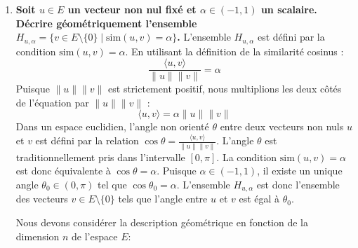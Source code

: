 \documentclass[11pt,a4paper]{report}
\begin{document}
\begin{enumerate}
  \(\lambda \le 0\). De plus, la définition de \(S'_u\) exige que
  \(v \ne 0\). Si \(\lambda = 0\), alors \(v = 0 \cdot u = 0\), ce qui
  contredit la condition \(v \in E \setminus \{0\}\). Par conséquent,
  \(\lambda\) doit être strictement négatif. Ainsi, l'ensemble \(S'_u\)
  est l'ensemble des vecteurs \(v\) qui sont des multiples scalaires
  strictement négatifs de \(u\). Géométriquement, \(S'_u\) représente la
  demi-droite ouverte issue de l'origine et passant par le vecteur
  \(-u\). Tous les vecteurs de \(S'_u\) sont colinéaires à \(u\) et ont
  la direction opposée à \(u\).
\item
  \textbf{Soit \(u \in E\) un vecteur non nul fixé et
  \(\alpha \in (-1, 1)\) un scalaire. Décrire géométriquement l'ensemble
  \(H_{u, \alpha} = \{v \in E \setminus \{0\} \mid \text{sim}(u, v) = \alpha\}\).}
  L'ensemble \(H_{u, \alpha}\) est défini par la condition
  \(\text{sim}(u, v) = \alpha\). En utilisant la définition de la
  similarité cosinus :
  \[\frac{\langle u, v \rangle}{\|u\| \|v\|} = \alpha\] Puisque
  \(\|u\| \|v\|\) est strictement positif, nous multiplions les deux
  côtés de l'équation par \(\|u\| \|v\|\) :
  \[\langle u, v \rangle = \alpha \|u\| \|v\|\] Dans un espace
  euclidien, l'angle non orienté \(\theta\) entre deux vecteurs non nuls
  \(u\) et \(v\) est défini par la relation
  \(\cos \theta = \frac{\langle u, v \rangle}{\|u\| \|v\|}\). L'angle
  \(\theta\) est traditionnellement pris dans l'intervalle \([0, \pi]\).
  La condition \(\text{sim}(u, v) = \alpha\) est donc équivalente à
  \(\cos \theta = \alpha\). Puisque \(\alpha \in (-1, 1)\), il existe un
  unique angle \(\theta_0 \in (0, \pi)\) tel que
  \(\cos \theta_0 = \alpha\). L'ensemble \(H_{u, \alpha}\) est donc
  l'ensemble des vecteurs \(v \in E \setminus \{0\}\) tels que l'angle
  entre \(u\) et \(v\) est égal à \(\theta_0\).

  Nous devons considérer la description géométrique en fonction de la
  dimension \(n\) de l'espace \(E\):


\end{enumerate}
\end{document}
